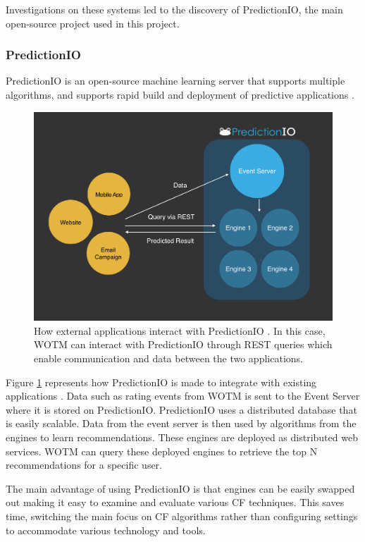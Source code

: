 Investigations on these systems led to the discovery of PredictionIO, the main open-source project used in this project.

\subsubsection{PredictionIO}

PredictionIO is an open-source machine learning server that supports multiple algorithms, and supports rapid build and deployment of predictive applications \cite{predictionio, predictionio2}.

\begin{figure}
\centering
\includegraphics[scale=0.35]{images/predictionIO}
\caption{ How external applications interact with PredictionIO \cite{predictionio}. In this case, WOTM can interact with PredictionIO through REST queries which enable communication and data between the two applications.}
\label{fig:predictionIO}
\end{figure}

Figure \ref{fig:predictionIO} represents how PredictionIO is made to integrate with existing applications \cite{predictionio}. Data such as rating events from WOTM is sent to the Event Server where it is stored on PredictionIO. PredictionIO uses a distributed database that is easily scalable. Data from the event server is then used by algorithms from the engines to learn recommendations. These engines are deployed as distributed web services. WOTM can query these deployed engines to retrieve the top N recommendations for a specific user. 

The main advantage of using PredictionIO is that engines can be easily swapped out making it easy to examine and evaluate various CF techniques. This saves time, switching the main focus on CF algorithms rather than configuring settings to accommodate various technology and tools.

